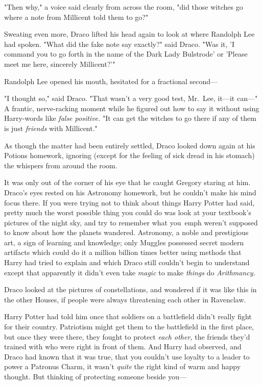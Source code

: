 "Then why," a voice said clearly from across the room, "did those witches go 
where a note from Millicent told them to go?"

Sweating even more, Draco lifted his head again to look at where Randolph Lee 
had spoken. "What did the fake note say exactly?" said Draco. "Was it, 'I 
command you to go forth in the name of the Dark Lady Bulstrode' or 'Please meet 
me here, sincerely Millicent?'"

Randolph Lee opened his mouth, hesitated for a fractional second---

"I thought so," said Draco. "That wasn't a very good test, Mr.~Lee, it---it 
can---" A frantic, nerve-racking moment while he figured out how to say it 
without using Harry-words like \emph{false positive.} "It can get the witches 
to go there if any of them is just \emph{friends} with Millicent."

As though the matter had been entirely settled, Draco looked down again at his 
Potions homework, ignoring (except for the feeling of sick dread in his 
stomach) the whispers from around the room.

It was only out of the corner of his eye that he caught Gregory staring at him.
\sbreak
Draco's eyes rested on his Astronomy homework, but he couldn't make his mind 
focus there. If you were trying not to think about things Harry Potter had 
said, pretty much the worst possible thing you could do was look at your 
textbook's pictures of the night sky, and try to remember what you\ emph{
weren't} supposed to know about how the planets wandered. Astronomy, a noble 
and prestigious art, a sign of learning and knowledge; only Muggles possessed 
secret modern artifacts which could do it a million billion times better using 
methods that Harry had tried to explain and which Draco still couldn't begin to 
understand except that apparently it didn't even take \emph{magic} to make 
\emph{things} do \emph{Arithmancy.}

Draco looked at the pictures of constellations, and wondered if it was like 
this in the other Houses, if people were always threatening each other in 
Ravenclaw.

Harry Potter had told him once that soldiers on a battlefield didn't really 
fight for their country. Patriotism might get them to the battlefield in the 
first place, but once they were there, they fought to protect \emph{each 
other,} the friends they'd trained with who were right in front of them. And 
Harry had observed, and Draco had known that it was true, that you couldn't use 
loyalty to a leader to power a Patronus Charm, it wasn't \emph{quite} the right 
kind of warm and happy thought. But thinking of protecting someone beside you---


